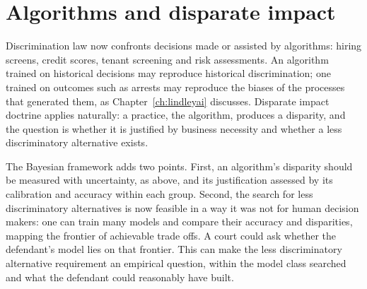 \section{Algorithms and disparate impact}

Discrimination law now confronts decisions made or assisted by algorithms: hiring screens, credit scores, tenant screening and risk assessments. An algorithm trained on historical decisions may reproduce historical discrimination; one trained on outcomes such as arrests may reproduce the biases of the processes that generated them, as Chapter~\ref{ch:lindleyai} discusses. Disparate impact doctrine applies naturally: a practice, the algorithm, produces a disparity, and the question is whether it is justified by business necessity and whether a less discriminatory alternative exists.

The Bayesian framework adds two points. First, an algorithm's disparity should be measured with uncertainty, as above, and its justification assessed by its calibration and accuracy within each group. Second, the search for less discriminatory alternatives is now feasible in a way it was not for human decision makers: one can train many models and compare their accuracy and disparities, mapping the frontier of achievable trade offs. A court could ask whether the defendant's model lies on that frontier. This can make the less discriminatory alternative requirement an empirical question, within the model class searched and what the defendant could reasonably have built.

